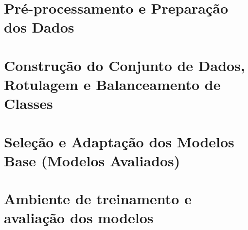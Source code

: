 \section{Pré-processamento e Preparação dos Dados}
\label{sec:prepdados}

    



\section{Construção do Conjunto de Dados, Rotulagem e Balanceamento de Classes}
\label{sec:conjunto_dados}

    


\section{Seleção e Adaptação dos Modelos Base (Modelos Avaliados)}
\label{sec:modelos}

    

\section{Ambiente de treinamento e avaliação dos modelos}
\label{sec:ambiente_treinamento}

    





